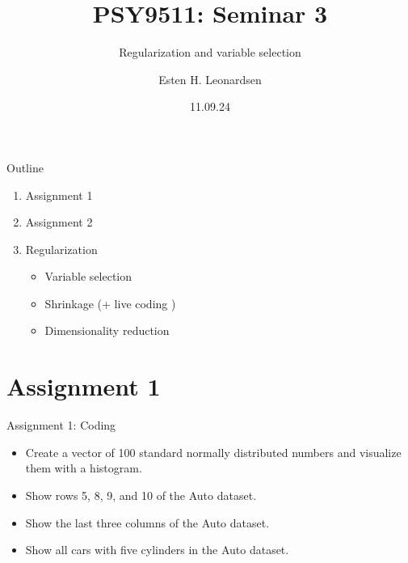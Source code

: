 \documentclass[8pt]{beamer}
\title{PSY9511: Seminar 3}
\subtitle{Regularization and variable selection}
\author{Esten H. Leonardsen}
\date{11.09.24}
\begin{document}
	\begin{frame}
	 	\maketitle
	\end{frame}

    \begin{frame}{Outline}
        \centering
        \vfill
        \begin{enumerate}
            \item Assignment 1
            \item Assignment 2
            \item Regularization
            \begin{itemize}
                \item Variable selection
                \item Shrinkage (+ live coding )
                \item Dimensionality reduction
            \end{itemize}
        \end{enumerate}
        \vfill
    \end{frame}

    \section{Assignment 1}

    \begin{frame}[t]{Assignment 1: Coding}
        \vspace{2cm}
        \begin{itemize}
            \item Create a vector of 100 standard normally distributed numbers and visualize them with a histogram.
            \item Show rows 5, 8, 9, and 10 of the Auto dataset.
            \item Show the last three columns of the Auto dataset.
            \item Show all cars with five cylinders in the Auto dataset.
        \end{itemize}

    \end{frame}
\end{document}
